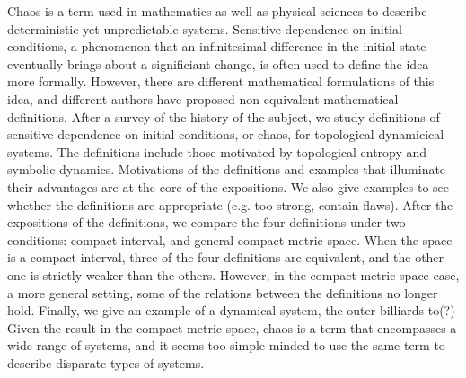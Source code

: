 \documentclass[12pt,twoside,draft]{book}
\begin{document}
Chaos is a term used in mathematics as well as physical sciences to describe deterministic yet unpredictable systems.
Sensitive dependence on initial conditions, a phenomenon that an infinitesimal difference in the initial state eventually brings about a significiant change, is often used to define the idea more formally.
However, there are different mathematical formulations of this idea, and different authors have proposed non-equivalent mathematical definitions.
After a survey of the history of the subject, we study definitions of sensitive dependence on initial conditions, or chaos, for topological dynamicical systems.
The definitions include those motivated by topological entropy and symbolic dynamics.
Motivations of the definitions and examples that illuminate their advantages are at the core of the expositions.
We also give examples to see whether the definitions are appropriate (e.g. too strong, contain flaws).
After the expositions of the definitions, we compare the four definitions under two conditions: compact interval, and general compact metric space.
When the space is a compact interval, three of the four definitions are equivalent, and the other one is strictly weaker than the others.
However, in the compact metric space case, a more general setting, some of the relations between the definitions no longer hold.
Finally, we give an example of a dynamical system, the outer billiards to(?)
Given the result in the compact metric space, chaos is a term that encompasses a wide range of systems, and it seems too simple-minded to use the same term to describe disparate types of systems.



\end{document}

